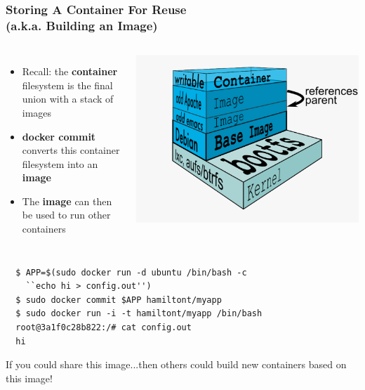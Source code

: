 \documentclass[xcolor=dvipsnames]{beamer}
\newcommand{\cpause}{}
\begin{document}
\begin{frame}[fragile]
  \frametitle{Storing A Container For Reuse \\(a.k.a. Building an Image)}

  \begin{columns}
    \begin{itemize}\itemsep0em
      \item Recall: the \textbf{container} filesystem is the final union with a stack of images

      \item \textbf{docker commit} converts this container filesystem into an \textbf{image}

      \item The \textbf{image} can then be used to run other containers
    \end{itemize}
    \includegraphics[width=\textwidth]{figures/union-fs.pdf}
  \end{columns} 
  \cpause

  \begin{lstlisting}
  $ APP=$(sudo docker run -d ubuntu /bin/bash -c 
    ``echo hi > config.out'')
  $ sudo docker commit $APP hamiltont/myapp
  $ sudo docker run -i -t hamiltont/myapp /bin/bash
  root@3a1f0c28b822:/# cat config.out
  hi
  \end{lstlisting}
  \cpause

  If you could share this image...then others could build new containers based on this image!

\end{frame}
\end{document}
